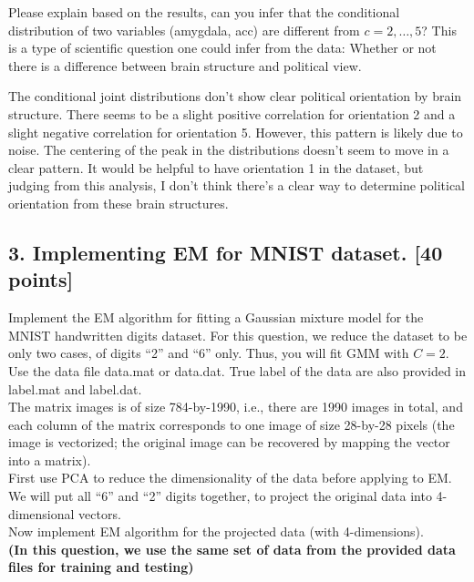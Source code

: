 \documentclass[twoside,12pt]{article}
\begin{document}
\begin{enumerate}[label*=\arabic*.]
 Please explain based on the results, can you infer that the conditional distribution of two variables (\textsf{amygdala}, \textsf{acc}) are different from $c = 2, \ldots, 5$? This is a type of scientific question one could infer from the data: Whether or not there is a difference between brain structure and political view.
 
 The conditional joint distributions don't show clear political orientation by brain structure. There seems to be a slight positive correlation for orientation 2 and a slight negative correlation for orientation 5. However, this pattern is likely due to noise. The centering of the peak in the distributions doesn't seem to move in a clear pattern. It would be helpful to have orientation 1 in the dataset, but judging from this analysis, I don't think there's a clear way to determine political orientation from these brain structures.
  
 \end{enumerate}
 

\subsection*{3. Implementing EM for MNIST dataset. [40 points]}

Implement the EM algorithm for fitting a Gaussian mixture model for the MNIST handwritten digits dataset. For this question, we reduce the dataset to be only two cases, of digits ``2'' and ``6'' only. Thus, you will fit GMM with $C = 2$. Use the data file \textsf{data.mat} or \textsf{data.dat}. True label of the data are also provided in \textsf{label.mat} and \textsf{label.dat}.
\\

The matrix \textsf{images} is of size 784-by-1990, i.e., there are 1990 images in total, and each column of the matrix corresponds to one image of size 28-by-28 pixels (the image is vectorized; the original image can be recovered by mapping the vector into a matrix).  \\

First use PCA to reduce the dimensionality of the data before applying to EM. We will put all ``6'' and ``2'' digits together, to project the original data into 4-dimensional vectors. \\

Now implement EM algorithm for the projected data (with 4-dimensions). \\
\textbf{(In this question, we use the same set of data from the provided data files for training and testing)}
\end{document}
